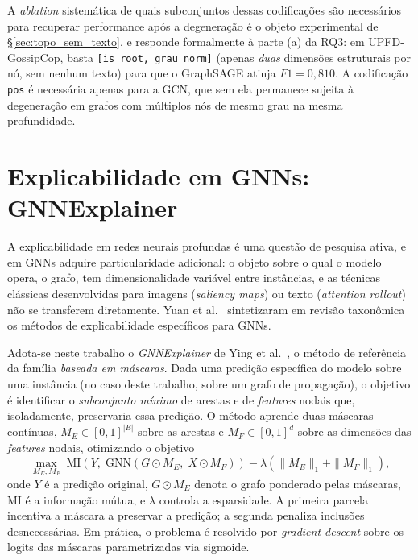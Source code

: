 A \emph{ablation} sistem\'atica de quais subconjuntos dessas codifica\c{c}\~oes
s\~ao necess\'arios para recuperar performance ap\'os a
degenera\c{c}\~ao \'e o objeto experimental de
\S\ref{sec:topo_sem_texto}, e responde formalmente \`a parte (a) da
RQ3: em UPFD-GossipCop, basta \texttt{[is\_root, grau\_norm]} (apenas
\emph{duas} dimens\~oes estruturais por n\'o, sem nenhum texto) para
que o GraphSAGE atinja $F1 = 0{,}810$. A codifica\c{c}\~ao \texttt{pos}
\'e necess\'aria apenas para a GCN, que sem ela permanece sujeita \`a
degenera\c{c}\~ao em grafos com m\'ultiplos n\'os de mesmo grau na
mesma profundidade.

\section{Explicabilidade em GNNs: GNNExplainer}
\label{sec:gnn_explainer}

A explicabilidade em redes neurais profundas \'e uma quest\~ao de
pesquisa ativa, e em GNNs adquire particularidade adicional: o objeto
sobre o qual o modelo opera, o grafo, tem dimensionalidade
vari\'avel entre inst\^ancias, e as t\'ecnicas cl\'assicas
desenvolvidas para imagens (\emph{saliency maps}) ou texto
(\emph{attention rollout}) n\~ao se transferem diretamente. Yuan et al.~\cite{yuan2022explainability} sintetizaram em revis\~ao
taxon\^omica os m\'etodos de explicabilidade espec\'ificos para GNNs.

Adota-se neste trabalho o \emph{GNNExplainer} de Ying et
al.~\cite{ying2019gnnexplainer}, o m\'etodo de refer\^encia da fam\'ilia
\emph{baseada em m\'ascaras}. Dada uma predi\c{c}\~ao espec\'ifica do
modelo sobre uma inst\^ancia (no caso deste trabalho, sobre um grafo de
propaga\c{c}\~ao), o objetivo \'e identificar o \emph{subconjunto
m\'inimo} de arestas e de \emph{features} nodais que, isoladamente,
preservaria essa predi\c{c}\~ao. O m\'etodo aprende
duas m\'ascaras cont\'inuas, $M_E \in [0, 1]^{|E|}$ sobre as arestas
e $M_F \in [0, 1]^{d}$ sobre as dimens\~oes das \emph{features} nodais,
otimizando o objetivo
\begin{equation}
\max_{M_E, M_F} \; \mathrm{MI}\!\left( Y,\; \mathrm{GNN}\!\left( G \odot M_E,\; X \odot M_F \right) \right) - \lambda \!\left( \| M_E \|_1 + \| M_F \|_1 \right),
\label{eq:gnnexplainer}
\end{equation}
onde $Y$ \'e a predi\c{c}\~ao original, $G \odot M_E$ denota o grafo
ponderado pelas m\'ascaras, $\mathrm{MI}$ \'e a informa\c{c}\~ao
m\'utua, e $\lambda$ controla a esparsidade. A primeira parcela
incentiva a m\'ascara a preservar a predi\c{c}\~ao; a segunda penaliza
inclus\~oes desnecess\'arias. Em pr\'atica, o problema \'e resolvido
por \emph{gradient descent} sobre os logits das m\'ascaras
parametrizadas via sigmoide.

